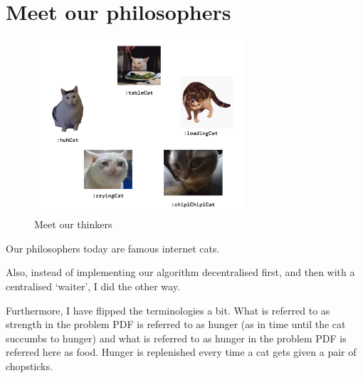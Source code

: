 \section{Meet our philosophers}

\begin{figure}[h!]
    \centering
    \includegraphics[width=0.7\textwidth]{cats}
    \caption{Meet our thinkers}
\end{figure}
Our philosophers today are famous internet cats.

Also, instead of implementing our algorithm decentralised first, and then with a centralised `waiter', I did the other way. 

Furthermore, I have flipped the terminologies a bit. What is referred to as strength in the problem PDF is referred to as hunger (as in time until the cat succumbs to hunger) and what is referred to as hunger in the problem PDF is referred here as food. Hunger is replenished every time a cat gets given a pair of chopsticks.
